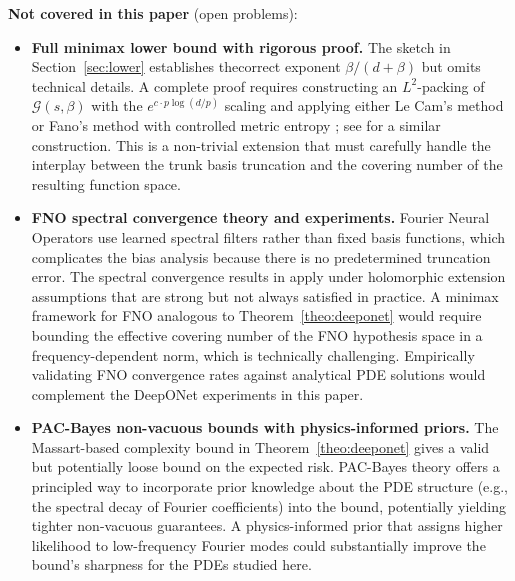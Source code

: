 \documentclass[12pt,a4paper]{article}
\begin{document}
\textbf{Not covered in this paper} (open problems):
\begin{itemize}
    \item \textbf{Full minimax lower bound with rigorous proof.}
        The sketch in Section~\ref{sec:lower} establishes thecorrect exponent
        $\beta/(d+\beta)$ but omits technical details.  A complete proof requires
        constructing an $L^2$-packing of $\mathcal{G}(s,\beta)$ with the
        $e^{c\cdot p\log(d/p)}$ scaling and applying either Le Cam's method or
        Fano's method with controlled metric entropy
        \citep{yu1997fano,wainwright2019high}; see \citet{bouchard2023minimax}
        for a similar construction.  This is a non-trivial extension that must
        carefully handle the interplay between the trunk basis truncation and the
        covering number of the resulting function space.

    \item \textbf{FNO spectral convergence theory and experiments.}
        Fourier Neural Operators use learned spectral filters rather than fixed
        basis functions, which complicates the bias analysis because there is no
        predetermined truncation error.  The spectral convergence results in
        \citet{kovachki2021fno,lanthaler2024holomorphic} apply under holomorphic
        extension assumptions that are strong but not always satisfied in practice.
        A minimax framework for FNO analogous to Theorem~\ref{theo:deeponet} would
        require bounding the effective covering number of the FNO hypothesis space
        in a frequency-dependent norm, which is technically challenging.
        Empirically validating FNO convergence rates against analytical PDE solutions
        would complement the DeepONet experiments in this paper.

    \item \textbf{PAC-Bayes non-vacuous bounds with physics-informed priors.}
        The Massart-based complexity bound in Theorem~\ref{theo:deeponet} gives a
        valid but potentially loose bound on the expected risk.  PAC-Bayes theory
        \citep{kovacevic2023nonvacuous} offers a principled way to incorporate
        prior knowledge about the PDE structure (e.g., the spectral decay of
        Fourier coefficients) into the bound, potentially yielding tighter
        non-vacuous guarantees.  A physics-informed prior that assigns higher
        likelihood to low-frequency Fourier modes could substantially improve the
        bound's sharpness for the PDEs studied here.


\end{itemize}
\end{document}
